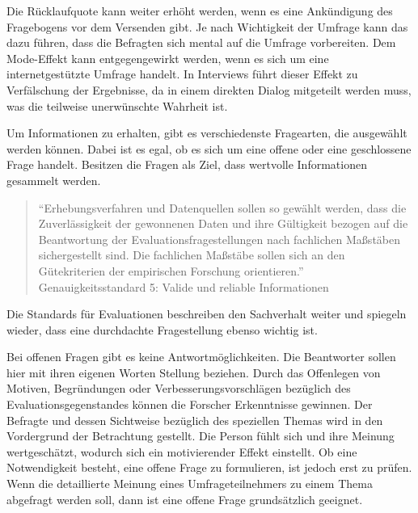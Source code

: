 Die Rücklaufquote kann weiter erhöht werden, wenn es eine Ankündigung des Fragebogens vor dem Versenden gibt.
Je nach Wichtigkeit der Umfrage kann das dazu führen, dass die Befragten sich mental auf die Umfrage vorbereiten.\autocite[Vgl.][S. 38]{Umfragenforschung}
Dem Mode-Effekt kann entgegengewirkt werden, wenn es sich um eine internetgestützte Umfrage handelt.
In Interviews führt dieser Effekt zu Verfälschung der Ergebnisse, da in einem direkten Dialog mitgeteilt werden muss, was die teilweise unerwünschte Wahrheit ist.\autocite[Vgl.][S. 163]{Umfragenforschung}

Um Informationen zu erhalten, gibt es verschiedenste Fragearten, die ausgewählt werden können.
Dabei ist es egal, ob es sich um eine offene oder eine geschlossene Frage handelt.\autocite[Vgl.][S. 31]{2009Fragebogen} %
Besitzen die Fragen als Ziel, dass wertvolle Informationen gesammelt werden.

\begin{quote} \enquote{Erhebungsverfahren und Datenquellen sollen so gewählt werden, dass die Zuverlässigkeit der gewonnenen Daten und ihre Gültigkeit bezogen auf die Beantwortung der Evaluationsfragestellungen nach fachlichen Maßstäben sichergestellt sind. Die fachlichen Maßstäbe sollen sich an den Gütekriterien der empirischen Forschung orientieren.} Genauigkeitsstandard 5: Valide und reliable Informationen\autocite[Siehe][]{DegEval} %
\end{quote}

Die Standards für Evaluationen beschreiben den Sachverhalt weiter und spiegeln wieder, dass eine durchdachte Fragestellung ebenso wichtig ist.

Bei offenen Fragen gibt es keine Antwortmöglichkeiten.
Die Beantworter sollen hier mit ihren eigenen Worten Stellung beziehen.
Durch das Offenlegen von Motiven, Begründungen oder Verbesserungsvorschlägen bezüglich des Evaluationsgegenstandes können die Forscher Erkenntnisse gewinnen.
Der Befragte und dessen Sichtweise bezüglich des speziellen Themas wird in den Vordergrund der Betrachtung gestellt.\autocite[Vgl.][S. 31]{2009Fragebogen} %
Die Person fühlt sich und ihre Meinung wertgeschätzt, wodurch sich ein motivierender Effekt einstellt.
Ob eine Notwendigkeit besteht, eine offene Frage zu formulieren, ist jedoch erst zu prüfen.
Wenn die detaillierte Meinung eines Umfrageteilnehmers zu einem Thema abgefragt werden soll, dann ist eine offene Frage grundsätzlich geeignet.

